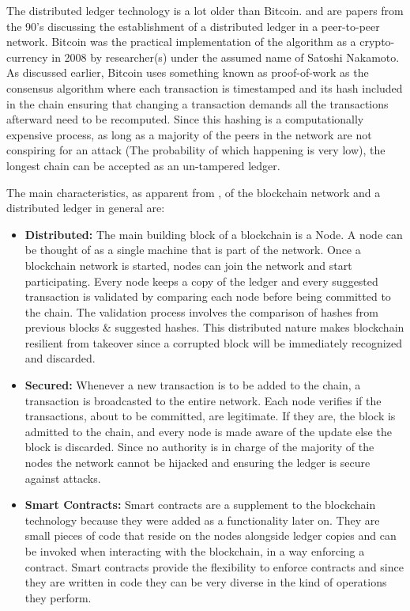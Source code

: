\bigskip
The distributed ledger technology is a lot older than Bitcoin. \cite{blind-signatures} and \cite{secure-names} are papers from the 90's discussing the establishment of a distributed ledger in a peer-to-peer network. Bitcoin was the practical implementation of the algorithm as a crypto-currency in 2008 by researcher(s) under the assumed name of Satoshi Nakamoto. As discussed earlier, Bitcoin uses something known as proof-of-work as the consensus algorithm where each transaction is timestamped and its hash included in the chain ensuring that changing a transaction demands all the transactions afterward need to be recomputed. Since this hashing is a computationally expensive process, as long as a majority of the peers in the network are not conspiring for an attack (The probability of which happening is very low), the longest chain can be accepted as an un-tampered ledger.

\bigskip
The main characteristics, as apparent from \cite{p2p-bitcoin}, of the blockchain network and a distributed ledger in general are:
\begin{itemize}
    \item \textbf{Distributed:} The main building block of a blockchain is a Node. A node can be thought of as a single machine that is part of the network. Once a blockchain network is started, nodes can join the network and start participating. Every node keeps a copy of the ledger and every suggested transaction is validated by comparing each node before being committed to the chain. The validation process involves the comparison of hashes from previous blocks \& suggested hashes. This distributed nature makes blockchain resilient from takeover since a corrupted block will be immediately recognized and discarded.
    \item \textbf{Secured:} Whenever a new transaction is to be added to the chain, a transaction is broadcasted to the entire network. Each node verifies if the transactions, about to be committed, are legitimate. If they are, the block is admitted to the chain, and every node is made aware of the update else the block is discarded. Since no authority is in charge of the majority of the nodes the network cannot be hijacked and ensuring the ledger is secure against attacks.
    \item \textbf{Smart Contracts:} Smart contracts are a supplement to the blockchain technology because they were added as a functionality later on. They are small pieces of code that reside on the nodes alongside ledger copies and can be invoked when interacting with the blockchain, in a way enforcing a contract. Smart contracts provide the flexibility to enforce contracts and since they are written in code they can be very diverse in the kind of operations they perform.
\end{itemize}

